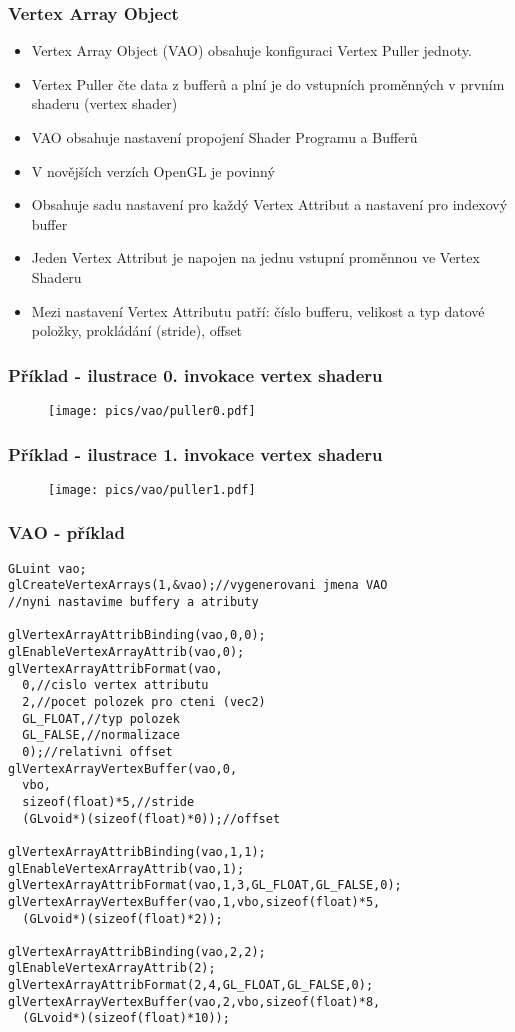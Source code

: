 
\begin{frame}
\frametitle{Vertex Array Object}
  \begin{itemize}
  \item Vertex Array Object (VAO) obsahuje konfiguraci Vertex Puller jednoty.
  \item Vertex Puller čte data z bufferů a plní je do vstupních proměnných v prvním shaderu (vertex shader)
  \item VAO obsahuje nastavení propojení Shader Programu a Bufferů
  \item V novějších verzích OpenGL je povinný
  \item Obsahuje sadu nastavení pro každý Vertex Attribut a nastavení pro indexový buffer
  \item Jeden Vertex Attribut je napojen na jednu vstupní proměnnou ve Vertex Shaderu
  \item Mezi nastavení Vertex Attributu patří: číslo bufferu, velikost a typ datové položky, prokládání (stride), offset
  \end{itemize}
\end{frame}

\begin{frame}
\frametitle{Příklad - ilustrace 0. invokace vertex shaderu}
  \begin{figure}[h]
  \texttt{[image: pics/vao/puller0.pdf]}
  \end{figure}
\end{frame}

\begin{frame}
\frametitle{Příklad - ilustrace 1. invokace vertex shaderu}
  \begin{figure}[h]
  \texttt{[image: pics/vao/puller1.pdf]}
  \end{figure}
\end{frame}

\begin{frame}[fragile]
\frametitle{VAO - příklad}
{\scriptsize
\begin{verbatim}
GLuint vao;
glCreateVertexArrays(1,&vao);//vygenerovani jmena VAO
//nyni nastavime buffery a atributy

glVertexArrayAttribBinding(vao,0,0);
glEnableVertexArrayAttrib(vao,0);
glVertexArrayAttribFormat(vao,
  0,//cislo vertex attributu
  2,//pocet polozek pro cteni (vec2)
  GL_FLOAT,//typ polozek
  GL_FALSE,//normalizace
  0);//relativni offset
glVertexArrayVertexBuffer(vao,0,
  vbo,
  sizeof(float)*5,//stride
  (GLvoid*)(sizeof(float)*0));//offset

glVertexArrayAttribBinding(vao,1,1);
glEnableVertexArrayAttrib(vao,1);
glVertexArrayAttribFormat(vao,1,3,GL_FLOAT,GL_FALSE,0);
glVertexArrayVertexBuffer(vao,1,vbo,sizeof(float)*5,
  (GLvoid*)(sizeof(float)*2));

glVertexArrayAttribBinding(vao,2,2);
glEnableVertexArrayAttrib(2);
glVertexArrayAttribFormat(2,4,GL_FLOAT,GL_FALSE,0);
glVertexArrayVertexBuffer(vao,2,vbo,sizeof(float)*8,
  (GLvoid*)(sizeof(float)*10));
\end{verbatim}
}
\end{frame}

